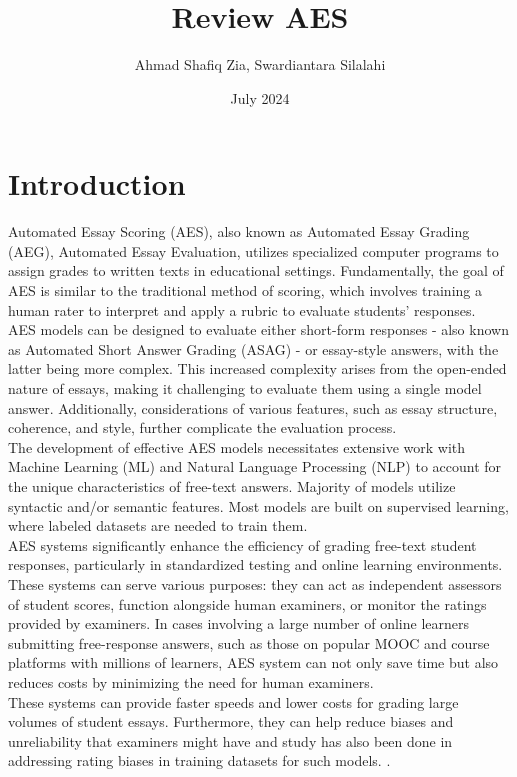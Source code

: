 \documentclass{article}
\title{Review AES}
\author{Ahmad Shafiq Zia, Swardiantara Silalahi}
\date{July 2024}
\begin{document}
    

\maketitle
\section{Introduction}
Automated Essay Scoring (AES), also known as Automated Essay Grading (AEG), Automated Essay Evaluation, utilizes specialized computer programs to assign grades to written texts in educational settings. Fundamentally, the goal of AES is similar to the traditional method of scoring, which involves training a human rater to interpret and apply a rubric to evaluate students' responses.\\

 AES models can be designed to evaluate either short-form responses - also known as Automated Short Answer Grading (ASAG) - or essay-style answers, with the latter being more complex. This increased complexity arises from the open-ended nature of essays, making it challenging to evaluate them using a single model answer. Additionally, considerations of various features, such as essay structure, coherence, and style, further complicate the evaluation process. \\
 
 The development of effective AES models necessitates extensive work with Machine Learning (ML) and Natural Language Processing (NLP) to account for the unique characteristics of free-text answers. Majority of models utilize syntactic and/or semantic features. Most models are built on supervised learning, where labeled datasets are needed to train them.
\\
AES systems significantly enhance the efficiency of grading free-text student responses, particularly in standardized testing and online learning environments. These systems can serve various purposes: they can act as independent assessors of student scores, function alongside human examiners, or monitor the ratings provided by examiners. In cases involving a large number of online learners submitting free-response answers, such as those on popular  MOOC and course platforms with millions of learners, AES system can not only save time but also reduces costs by minimizing the need for human examiners. \\

These systems can provide faster speeds and lower costs for grading large volumes of student essays. Furthermore, they can help reduce biases and unreliability that examiners might have \cite{malouff2016bias} and study has also been done in addressing rating biases in training datasets for such models. \cite{amorim2018aesbias}.\\
\end{document}

